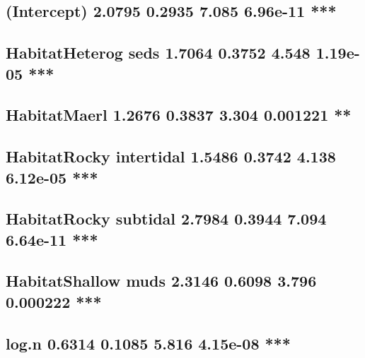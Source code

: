\documentclass[
]{article}
\begin{document}
\hypertarget{intercept-2.0795-0.2935-7.085-6.96e-11}{%
\subsection{(Intercept) 2.0795 0.2935 7.085 6.96e-11
***}\label{intercept-2.0795-0.2935-7.085-6.96e-11}}

\hypertarget{habitatheterog-seds-1.7064-0.3752-4.548-1.19e-05}{%
\subsection{HabitatHeterog seds 1.7064 0.3752 4.548 1.19e-05
***}\label{habitatheterog-seds-1.7064-0.3752-4.548-1.19e-05}}

\hypertarget{habitatmaerl-1.2676-0.3837-3.304-0.001221}{%
\subsection{HabitatMaerl 1.2676 0.3837 3.304 0.001221
**}\label{habitatmaerl-1.2676-0.3837-3.304-0.001221}}

\hypertarget{habitatrocky-intertidal-1.5486-0.3742-4.138-6.12e-05}{%
\subsection{HabitatRocky intertidal 1.5486 0.3742 4.138 6.12e-05
***}\label{habitatrocky-intertidal-1.5486-0.3742-4.138-6.12e-05}}

\hypertarget{habitatrocky-subtidal-2.7984-0.3944-7.094-6.64e-11}{%
\subsection{HabitatRocky subtidal 2.7984 0.3944 7.094 6.64e-11
***}\label{habitatrocky-subtidal-2.7984-0.3944-7.094-6.64e-11}}

\hypertarget{habitatshallow-muds-2.3146-0.6098-3.796-0.000222}{%
\subsection{HabitatShallow muds 2.3146 0.6098 3.796 0.000222
***}\label{habitatshallow-muds-2.3146-0.6098-3.796-0.000222}}

\hypertarget{log.n-0.6314-0.1085-5.816-4.15e-08}{%
\subsection{log.n 0.6314 0.1085 5.816 4.15e-08
***}\label{log.n-0.6314-0.1085-5.816-4.15e-08}}
\end{document}
